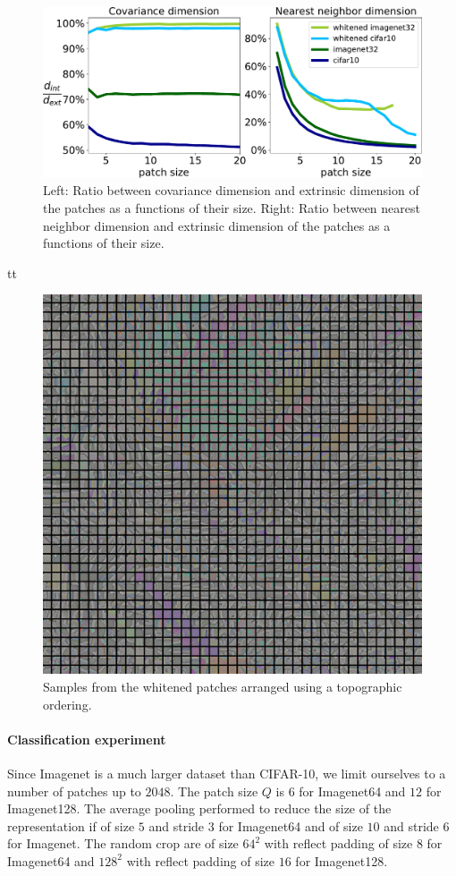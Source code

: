 \documentclass{article}
\begin{document}
\begin{figure}
	\includegraphics[width=.95\linewidth]{figures/intrinsic_dims}
	\caption{Left: Ratio between covariance dimension and extrinsic dimension of the patches as a functions of their size. Right: Ratio between nearest neighbor dimension and extrinsic dimension of the patches as a functions of their size.}
\end{figure}
tt

\begin{figure}
\centeringt
	\includegraphics[width=1.\linewidth]{figures/topographical_order_more_patches}
	\caption{Samples from the whitened patches arranged using a topographic ordering.}
\end{figure}


\paragraph{Classification experiment} Since Imagenet is a much larger dataset than CIFAR-10, we limit ourselves to a number of patches up to $2048$.
The patch size $Q$ is $6$ for Imagenet64 and $12$ for Imagenet128.
The average pooling performed to reduce the size of the representation if of size $5$ and stride $3$ for Imagenet64 and of size $10$ and stride $6$ for Imagenet.
The random crop are of size $64^2$ with reflect padding of size $8$ for Imagenet64 and  $128^2$ with reflect padding of size $16$ for Imagenet128.
\end{document}

